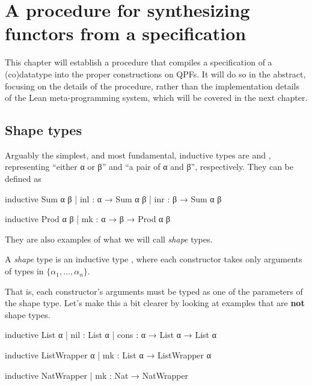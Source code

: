 
\chapter{A procedure for synthesizing functors from a specification}%
\label{ch:procedure}

This chapter will establish a procedure that compiles a specification of a (co)datatype
into the proper constructions on QPFs.
It will do so in the abstract, focusing on the details of the procedure, rather than the implementation
details of the Lean meta-programming system, which will be covered in the next chapter.


\section{Shape types}%
\label{sec:shape_types}

Arguably the simplest, and most fundamental, inductive types are  and ,
representing ``either α or β'' and ``a pair of α and β'', respectively.
They can be defined as

\begin{center}
\begin{minipage}[t]{0.45\linewidth}
    \begin{leancode}
inductive Sum α β
  | inl : α → Sum α β
  | inr : β → Sum α β
    \end{leancode}
\end{minipage}
\begin{minipage}[t]{0.45\linewidth}
    \begin{leancode}    
inductive Prod α β
  | mk : α → β → Prod α β
    \end{leancode}
\end{minipage}
\end{center}

They are also examples of what we will call \emph{shape} types.
\begin{definition}
    A \emph{shape} type is an inductive type , 
    where each constructor takes only arguments of types in $\{α_1, \ldots, α_n\}$.
\end{definition}
That is, each constructor's arguments must be typed as one of the parameters of the shape type.
Let's make this a bit clearer by looking at examples that are \textbf{not} shape types. 

\begin{leancode}
  inductive List α
    | nil  : List α 
    | cons : α → List α → List α

  inductive ListWrapper α
    | mk : List α → ListWrapper α

  inductive NatWrapper
    | mk : Nat → NatWrapper
\end{leancode}

